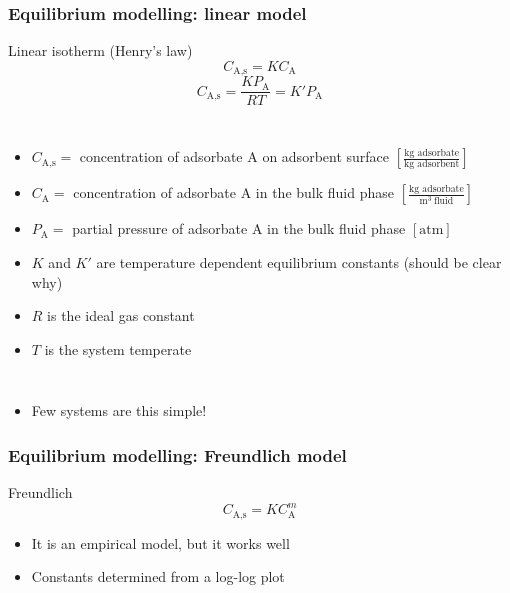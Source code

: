 \begin{frame}\frametitle{Equilibrium modelling: linear model}
	\begin{exampleblock}{Linear isotherm (Henry's law)}
		\[C_\text{A,s} = K C_\text{A}\]
		\[C_\text{A,s} = \frac{K P_\text{A}}{RT} = K' P_\text{A}\]
	\end{exampleblock}
	\begin{columns}[t]
			\begin{itemize}
				\item	{\small $C_\text{A,s} =$ concentration of adsorbate A on adsorbent surface \hfill $\left[\displaystyle \frac{\text{kg adsorbate}}{\text{kg adsorbent}}\right]$}
				\item	{\small $C_\text{A} =$ concentration of adsorbate A in the bulk fluid phase \hfill $\left[\displaystyle \frac{\text{kg adsorbate}}{\text{m}^3~ \text{fluid}}\right]$}
				\item	{\small $P_\text{A} =$ partial pressure of adsorbate A in the bulk fluid phase \hfill $\left[ \text{atm}\right]\,$}
				\item	{\small $K$ and $K'$ are temperature dependent equilibrium constants {\tiny (should be clear why)}}
				\item	{\small $R$ is the ideal gas constant}
				\item	{\small $T$ is the system temperate}
			\end{itemize}
	\end{columns}
	\vspace{12pt}
	\begin{itemize}
		\item	Few systems are this simple!
	\end{itemize}
\end{frame}

\begin{frame}\frametitle{Equilibrium modelling: Freundlich model}
	\begin{exampleblock}{Freundlich}
		\[C_\text{A,s} = K C_\text{A}^m\]
	\end{exampleblock}

	\vspace{12pt}
	\begin{itemize}
		\item	It is an empirical model, but it works well
		\item	Constants determined from a log-log plot
	\end{itemize}
\end{frame}

